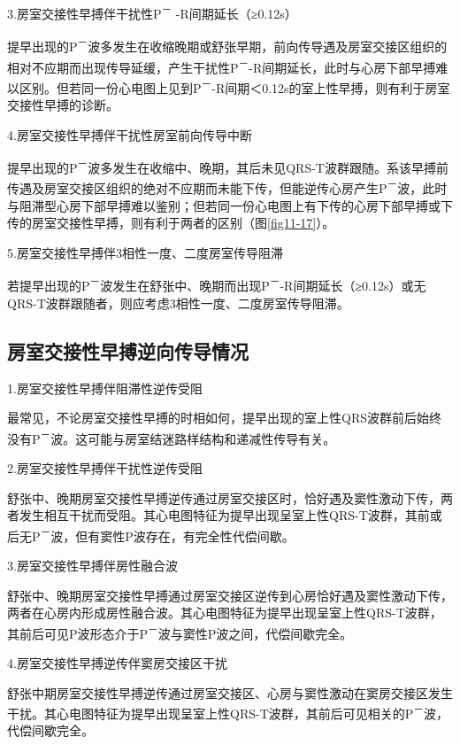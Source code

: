 3.房室交接性早搏伴干扰性P\textsuperscript{－} -R间期延长（≥0.12s）

提早出现的P\textsuperscript{－}波多发生在收缩晚期或舒张早期，前向传导遇及房室交接区组织的相对不应期而出现传导延缓，产生干扰性P\textsuperscript{－}-R间期延长，此时与心房下部早搏难以区别。但若同一份心电图上见到P\textsuperscript{－}-R间期＜0.12s的室上性早搏，则有利于房室交接性早搏的诊断。

4.房室交接性早搏伴干扰性房室前向传导中断

提早出现的P\textsuperscript{－}波多发生在收缩中、晚期，其后未见QRS-T波群跟随。系该早搏前传遇及房室交接区组织的绝对不应期而未能下传，但能逆传心房产生P\textsuperscript{－}波，此时与阻滞型心房下部早搏难以鉴别；但若同一份心电图上有下传的心房下部早搏或下传的房室交接性早搏，则有利于两者的区别（图\ref{fig11-17}）。

5.房室交接性早搏伴3相性一度、二度房室传导阻滞

若提早出现的P\textsuperscript{－}波发生在舒张中、晚期而出现P\textsuperscript{－}-R间期延长（≥0.12s）或无QRS-T波群跟随者，则应考虑3相性一度、二度房室传导阻滞。

\protect\hypertarget{text00018.htmlux5cux23subid147}{}{}

\subsection{房室交接性早搏逆向传导情况}

1.房室交接性早搏伴阻滞性逆传受阻

最常见，不论房室交接性早搏的时相如何，提早出现的室上性QRS波群前后始终没有P\textsuperscript{－}波。这可能与房室结迷路样结构和递减性传导有关。

2.房室交接性早搏伴干扰性逆传受阻

舒张中、晚期房室交接性早搏逆传通过房室交接区时，恰好遇及窦性激动下传，两者发生相互干扰而受阻。其心电图特征为提早出现呈室上性QRS-T波群，其前或后无P\textsuperscript{－}波，但有窦性P波存在，有完全性代偿间歇。

3.房室交接性早搏伴房性融合波

舒张中、晚期房室交接性早搏通过房室交接区逆传到心房恰好遇及窦性激动下传，两者在心房内形成房性融合波。其心电图特征为提早出现呈室上性QRS-T波群，其前后可见P波形态介于P\textsuperscript{－}波与窦性P波之间，代偿间歇完全。

4.房室交接性早搏逆传伴窦房交接区干扰

舒张中期房室交接性早搏逆传通过房室交接区、心房与窦性激动在窦房交接区发生干扰。其心电图特征为提早出现呈室上性QRS-T波群，其前后可见相关的P\textsuperscript{－}波，代偿间歇完全。

